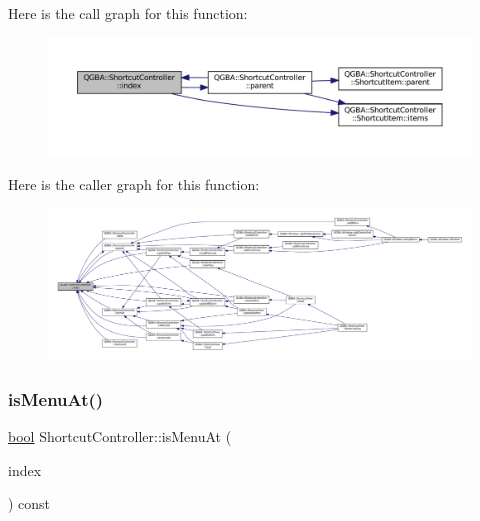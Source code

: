 Here is the call graph for this function\+:
\nopagebreak
\begin{figure}[H]
\begin{center}
\leavevmode
\includegraphics[width=350pt]{class_q_g_b_a_1_1_shortcut_controller_ae75cb760bb05d9e1e20b8f1080884cbd_cgraph}
\end{center}
\end{figure}
Here is the caller graph for this function\+:
\nopagebreak
\begin{figure}[H]
\begin{center}
\leavevmode
\includegraphics[width=350pt]{class_q_g_b_a_1_1_shortcut_controller_ae75cb760bb05d9e1e20b8f1080884cbd_icgraph}
\end{center}
\end{figure}
\mbox{\label{class_q_g_b_a_1_1_shortcut_controller_afcb396dd1166444596103d04c85b5b7d}} 
\subsubsection{\texorpdfstring{is\+Menu\+At()}{isMenuAt()}}
{\footnotesize\ttfamily \mbox{\hyperlink{libretro_8h_a4a26dcae73fb7e1528214a068aca317e}{bool}} Shortcut\+Controller\+::is\+Menu\+At (\begin{DoxyParamCaption}\item[{const Q\+Model\+Index \&}]{index }\end{DoxyParamCaption}) const}

